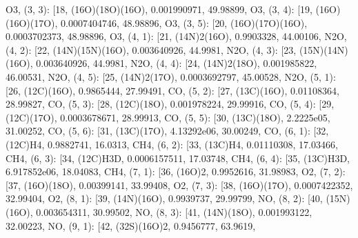 \documentclass[letterpaper,10pt,english]{sphinxmanual}
\begin{document}
\begin{fulllineitems}
\textquotesingle{}O3\textquotesingle{}{]}, (3, 3): {[}18, \textquotesingle{}(16O)(18O)(16O)\textquotesingle{}, 0.001990971, 49.98899, \textquotesingle{}O3\textquotesingle{}{]}, (3, 4): {[}19, \textquotesingle{}(16O)(16O)(17O)\textquotesingle{}, 0.0007404746, 48.98896, \textquotesingle{}O3\textquotesingle{}{]}, (3, 5): {[}20, \textquotesingle{}(16O)(17O)(16O)\textquotesingle{}, 0.0003702373, 48.98896, \textquotesingle{}O3\textquotesingle{}{]}, (4, 1): {[}21, \textquotesingle{}(14N)2(16O)\textquotesingle{}, 0.9903328, 44.00106, \textquotesingle{}N2O\textquotesingle{}{]}, (4, 2): {[}22, \textquotesingle{}(14N)(15N)(16O)\textquotesingle{}, 0.003640926, 44.9981, \textquotesingle{}N2O\textquotesingle{}{]}, (4, 3): {[}23, \textquotesingle{}(15N)(14N)(16O)\textquotesingle{}, 0.003640926, 44.9981, \textquotesingle{}N2O\textquotesingle{}{]}, (4, 4): {[}24, \textquotesingle{}(14N)2(18O)\textquotesingle{}, 0.001985822, 46.00531, \textquotesingle{}N2O\textquotesingle{}{]}, (4, 5): {[}25, \textquotesingle{}(14N)2(17O)\textquotesingle{}, 0.0003692797, 45.00528, \textquotesingle{}N2O\textquotesingle{}{]}, (5, 1): {[}26, \textquotesingle{}(12C)(16O)\textquotesingle{}, 0.9865444, 27.99491, \textquotesingle{}CO\textquotesingle{}{]}, (5, 2): {[}27, \textquotesingle{}(13C)(16O)\textquotesingle{}, 0.01108364, 28.99827, \textquotesingle{}CO\textquotesingle{}{]}, (5, 3): {[}28, \textquotesingle{}(12C)(18O)\textquotesingle{}, 0.001978224, 29.99916, \textquotesingle{}CO\textquotesingle{}{]}, (5, 4): {[}29, \textquotesingle{}(12C)(17O)\textquotesingle{}, 0.0003678671, 28.99913, \textquotesingle{}CO\textquotesingle{}{]}, (5, 5): {[}30, \textquotesingle{}(13C)(18O)\textquotesingle{}, 2.2225e\sphinxhyphen{}05, 31.00252, \textquotesingle{}CO\textquotesingle{}{]}, (5, 6): {[}31, \textquotesingle{}(13C)(17O)\textquotesingle{}, 4.13292e\sphinxhyphen{}06, 30.00249, \textquotesingle{}CO\textquotesingle{}{]}, (6, 1): {[}32, \textquotesingle{}(12C)H4\textquotesingle{}, 0.9882741, 16.0313, \textquotesingle{}CH4\textquotesingle{}{]}, (6, 2): {[}33, \textquotesingle{}(13C)H4\textquotesingle{}, 0.01110308, 17.03466, \textquotesingle{}CH4\textquotesingle{}{]}, (6, 3): {[}34, \textquotesingle{}(12C)H3D\textquotesingle{}, 0.0006157511, 17.03748, \textquotesingle{}CH4\textquotesingle{}{]}, (6, 4): {[}35, \textquotesingle{}(13C)H3D\textquotesingle{}, 6.917852e\sphinxhyphen{}06, 18.04083, \textquotesingle{}CH4\textquotesingle{}{]}, (7, 1): {[}36, \textquotesingle{}(16O)2\textquotesingle{}, 0.9952616, 31.98983, \textquotesingle{}O2\textquotesingle{}{]}, (7, 2): {[}37, \textquotesingle{}(16O)(18O)\textquotesingle{}, 0.00399141, 33.99408, \textquotesingle{}O2\textquotesingle{}{]}, (7, 3): {[}38, \textquotesingle{}(16O)(17O)\textquotesingle{}, 0.0007422352, 32.99404, \textquotesingle{}O2\textquotesingle{}{]}, (8, 1): {[}39, \textquotesingle{}(14N)(16O)\textquotesingle{}, 0.9939737, 29.99799, \textquotesingle{}NO\textquotesingle{}{]}, (8, 2): {[}40, \textquotesingle{}(15N)(16O)\textquotesingle{}, 0.003654311, 30.99502, \textquotesingle{}NO\textquotesingle{}{]}, (8, 3): {[}41, \textquotesingle{}(14N)(18O)\textquotesingle{}, 0.001993122, 32.00223, \textquotesingle{}NO\textquotesingle{}{]}, (9, 1): {[}42, \textquotesingle{}(32S)(16O)2\textquotesingle{}, 0.9456777, 63.9619, 
\end{fulllineitems}
\end{document}
